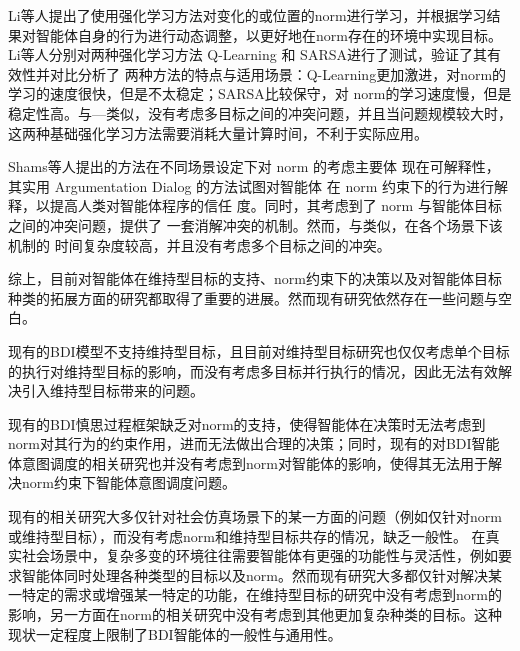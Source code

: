Li等人\cite{DBLP:conf/atal/LiMFL15}提出了使用强化学习方法对变化的或位置的norm进行学习，并根据学习结果对智能体自身的行为进行动态调整，以更好地在norm存在的环境中实现目标。Li等人\cite{DBLP:conf/atal/LiMFL15}分别对两种强化学习方法 Q-Learning 和 SARSA\cite{Sutton2005ReinforcementLA}进行了测试，验证了其有效性并对比分析了 两种方法的特点与适用场景：Q-Learning更加激进，对norm的学习的速度很快，但是不太稳定；SARSA比较保守，对 norm的学习速度慢，但是稳定性高。与—类似，\cite{DBLP:conf/atal/LiMFL15}没有考虑多目标之间的冲突问题，并且当问题规模较大时，这两种基础强化学习方法需要消耗大量计算时间，不利于实际应用。

Shams等人\cite{DBLP:conf/ijcai/ShamsVOP16,DBLP:journals/taas/ShamsVOP20,DBLP:conf/atal/ShamsVPV15}提出的方法在不同场景设定下对 norm 的考虑主要体 现在可解释性，其实用 Argumentation Dialog 的方法试图对智能体 在 norm 约束下的行为进行解释，以提高人类对智能体程序的信任 度。同时，其考虑到了 norm 与智能体目标之间的冲突问题，提供了 一套消解冲突的机制。然而，与\cite{DBLP:conf/atal/LiMFL15}类似，在各个场景下该机制的 时间复杂度较高，并且没有考虑多个目标之间的冲突。


综上，目前对智能体在维持型目标的支持、norm约束下的决策以及对智能体目标种类的拓展方面的研究都取得了重要的进展。然而现有研究依然存在一些问题与空白。

现有的BDI模型不支持维持型目标，且目前对维持型目标研究也仅仅考虑单个目标的执行对维持型目标的影响，而没有考虑多目标并行执行的情况，因此无法有效解决引入维持型目标带来的问题。

现有的BDI慎思过程框架缺乏对norm的支持，使得智能体在决策时无法考虑到norm对其行为的约束作用，进而无法做出合理的决策；同时，现有的对BDI智能体意图调度的相关研究也并没有考虑到norm对智能体的影响，使得其无法用于解决norm约束下智能体意图调度问题。

现有的相关研究大多仅针对社会仿真场景下的某一方面的问题（例如仅针对norm或维持型目标），而没有考虑norm和维持型目标共存的情况，缺乏一般性。
在真实社会场景中，复杂多变的环境往往需要智能体有更强的功能性与灵活性，例如要求智能体同时处理各种类型的目标以及norm。然而现有研究大多都仅针对解决某一特定的需求或增强某一特定的功能，在维持型目标的研究中没有考虑到norm的影响，另一方面在norm的相关研究中没有考虑到其他更加复杂种类的目标。这种现状一定程度上限制了BDI智能体的一般性与通用性。


